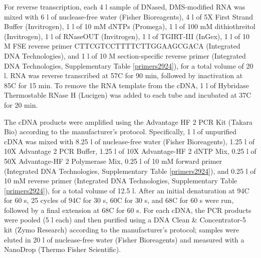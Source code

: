 \documentclass[main.tex]{subfiles}
\begin{document}
For reverse transcription, each 4 \textmu l sample of DNased, DMS-modified RNA was mixed with 6 \textmu l of nuclease-free water (Fisher Bioreagents), 4 \textmu l of 5X First Strand Buffer (Invitrogen), 1 \textmu l of 10 mM dNTPs (Promega), 1 \textmu l of 100 mM dithiothreitol (Invitrogen), 1 \textmu l of RNaseOUT (Invitrogen), 1 \textmu l of TGIRT-III (InGex), 1 \textmu l of 10 \textmu M FSE reverse primer CTTCGTCCTTTTCTTGGAAGCGACA (Integrated DNA Technologies), and 1 \textmu l of 10 \textmu M section-specific reverse primer (Integrated DNA Technologies, Supplementary Table \ref{primers2924}), for a total volume of 20 \textmu l.
RNA was reverse transcribed at 57\textdegree C for 90 min, followed by inactivation at 85\textdegree C for 15 min.
To remove the RNA template from the cDNA, 1 \textmu l of Hybridase Thermostable RNase H (Lucigen) was added to each tube and incubated at 37\textdegree C for 20 min.

The cDNA products were amplified using the Advantage HF 2 PCR Kit (Takara Bio) according to the manufacturer's protocol.
Specifically, 1 \textmu l of unpurified cDNA was mixed with 8.25 \textmu l of nuclease-free water (Fisher Bioreagents), 1.25 \textmu l of 10X Advantage 2 PCR Buffer, 1.25 \textmu l of 10X Advantage-HF 2 dNTP Mix, 0.25 \textmu l of 50X Advantage-HF 2 Polymerase Mix, 0.25 \textmu l of 10 mM forward primer (Integrated DNA Technologies, Supplementary Table \ref{primers2924}), and 0.25 \textmu l of 10 mM reverse primer (Integrated DNA Technologies, Supplementary Table \ref{primers2924}), for a total volume of 12.5 \textmu l.
After an initial denaturation at 94\textdegree C for 60 s, 25 cycles of 94\textdegree C for 30 s, 60\textdegree C for 30 s, and 68\textdegree C for 60 s were run, followed by a final extension at 68\textdegree C for 60 s.
For each cDNA, the PCR products were pooled (5 \textmu l each) and then purified using a DNA Clean \& Concentrator-5 kit (Zymo Research) according to the manufacturer's protocol; samples were eluted in 20 \textmu l of nuclease-free water (Fisher Bioreagents) and measured with a NanoDrop (Thermo Fisher Scientific).
\end{document}
